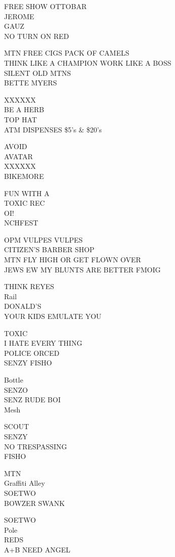 \documentclass[10pt,letterpaper]{article}
\begin{document}
FREE SHOW OTTOBAR\\
JEROME\\
GAUZ\\
NO TURN ON RED

MTN FREE CIGS PACK OF CAMELS\\
THINK LIKE A CHAMPION WORK LIKE A BOSS\\
SILENT OLD MTNS\\
BETTE MYERS

XXXXXX\\
BE A HERB\\
TOP HAT\\
ATM DISPENSES \$5's \& \$20's

AVOID\\
AVATAR\\
XXXXXX\\
BIKEMORE

FUN WITH A\\
TOXIC REC\\
OI!\\
NCHFEST

OPM VULPES VULPES\\
CITIZEN'S BARBER SHOP\\
MTN FLY HIGH OR GET FLOWN OVER\\
JEWS EW MY BLUNTS ARE BETTER FMOIG

THINK REYES\\
Rail\\
DONALD'S\\
YOUR KIDS EMULATE YOU

TOXIC\\
I HATE EVERY THING\\
POLICE ORCED\\
SENZY FISHO

Bottle\\
SENZO\\
SENZ RUDE BOI\\
Mesh

SCOUT\\
SENZY\\
NO TRESPASSING\\
FISHO

MTN\\
Graffiti Alley\\
SOETWO\\
BOWZER SWANK

SOETWO\\
Pole\\
REDS\\
A+B NEED ANGEL
\end{document}
